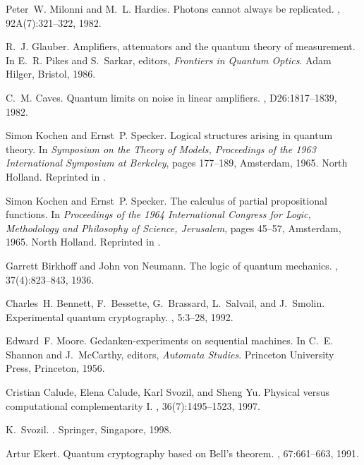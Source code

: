 \documentclass [11pt]{llncs}
\begin{document}
\begin{thebibliography}{10}
Peter~W. Milonni and M.~L. Hardies.
\newblock Photons cannot always be replicated.
, 92A(7):321--322, 1982.

R.~J. Glauber.
\newblock Amplifiers, attenuators and the quantum theory of measurement.
\newblock In E.~R. Pikes and S.~Sarkar, editors, {\em Frontiers in Quantum
  Optics}. Adam Hilger, Bristol, 1986.

C.~M. Caves.
\newblock Quantum limits on noise in linear amplifiers.
, D26:1817--1839, 1982.

Simon Kochen and Ernst~P. Specker.
\newblock Logical structures arising in quantum theory.
\newblock In {\em Symposium on the Theory of Models, Proceedings of the 1963
  International Symposium at Berkeley}, pages 177--189, Amsterdam, 1965. North
  Holland.
\newblock Reprinted in \cite[pp. 209--221]{specker-ges}.

Simon Kochen and Ernst~P. Specker.
\newblock The calculus of partial propositional functions.
\newblock In {\em Proceedings of the 1964 International Congress for Logic,
  Methodology and Philosophy of Science, Jerusalem}, pages 45--57, Amsterdam,
  1965. North Holland.
\newblock Reprinted in \cite[pp. 222--234]{specker-ges}.

Garrett Birkhoff and John von Neumann.
\newblock The logic of quantum mechanics.
, 37(4):823--843, 1936.

Charles~H. Bennett, F.~Bessette, G.~Brassard, L.~Salvail, and J.~Smolin.
\newblock Experimental quantum cryptography.
, 5:3--28, 1992.

Edward~F. Moore.
\newblock Gedanken-experiments on sequential machines.
\newblock In C.~E. Shannon and J.~McCarthy, editors, {\em Automata Studies}.
  Princeton University Press, Princeton, 1956.

Cristian Calude, Elena Calude, Karl Svozil, and Sheng Yu.
\newblock Physical versus computational complementarity {I}.
, 36(7):1495--1523,
  1997.

K.~Svozil.
.
\newblock Springer, Singapore, 1998.

Artur Ekert.
\newblock Quantum cryptography based on {B}ell's theorem.
, 67:661--663, 1991.


\end{thebibliography}
\end{document}
